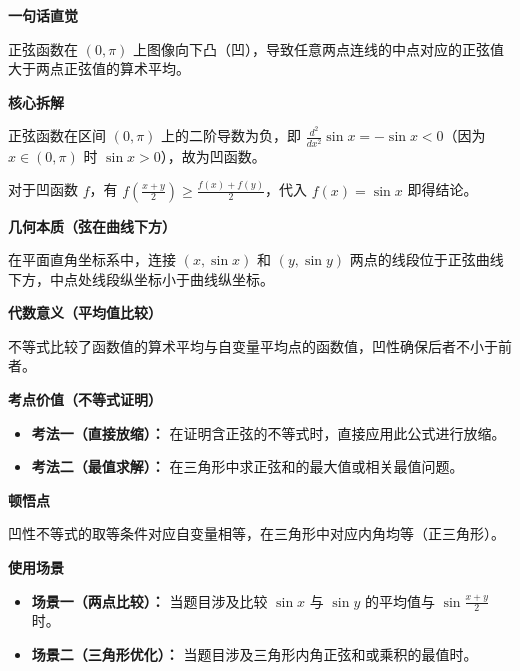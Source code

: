 \begin{explanationbox}
\textbf{\textcolor{CExplanation}{一句话直觉}}

正弦函数在 $(0, \pi)$ 上图像向下凸（凹），导致任意两点连线的中点对应的正弦值大于两点正弦值的算术平均。

\medskip
\textbf{\textcolor{CExplanation}{核心拆解}}
\begin{description}[style=nextline, leftmargin=2.8em, labelsep=0.5em, itemsep=0.45em]
    \item[\textbf{要点一（凹性判定）：}] 正弦函数在区间 $(0, \pi)$ 上的二阶导数为负，即 $\frac{d^2}{dx^2} \sin x = -\sin x < 0$（因为 $x \in (0, \pi)$ 时 $\sin x > 0$），故为凹函数。
    \item[\textbf{要点二（凹性不等式）：}] 对于凹函数 $f$，有 $f\left(\frac{x+y}{2}\right) \geq \frac{f(x)+f(y)}{2}$，代入 $f(x)=\sin x$ 即得结论。
\end{description}

\medskip
\textbf{\textcolor{CExplanation}{几何本质（弦在曲线下方）}}

在平面直角坐标系中，连接 $(x, \sin x)$ 和 $(y, \sin y)$ 两点的线段位于正弦曲线下方，中点处线段纵坐标小于曲线纵坐标。

\medskip
\textbf{\textcolor{CExplanation}{代数意义（平均值比较）}}

不等式比较了函数值的算术平均与自变量平均点的函数值，凹性确保后者不小于前者。

\medskip
\textbf{\textcolor{CExplanation}{考点价值（不等式证明）}}
\begin{itemize}[leftmargin=*, itemsep=0.5em, topsep=0.4em]
    \item \textbf{考法一（直接放缩）：} 在证明含正弦的不等式时，直接应用此公式进行放缩。
    \item \textbf{考法二（最值求解）：} 在三角形中求正弦和的最大值或相关最值问题。
\end{itemize}

\medskip
\textbf{\textcolor{CExplanation}{顿悟点}}

凹性不等式的取等条件对应自变量相等，在三角形中对应内角均等（正三角形）。

\medskip
\textbf{\textcolor{CExplanation}{使用场景}}
\begin{itemize}[leftmargin=*, itemsep=0.5em, topsep=0.4em]
    \item \textbf{场景一（两点比较）：} 当题目涉及比较 $\sin x$ 与 $\sin y$ 的平均值与 $\sin\frac{x+y}{2}$ 时。
    \item \textbf{场景二（三角形优化）：} 当题目涉及三角形内角正弦和或乘积的最值时。
\end{itemize}
\end{explanationbox}
